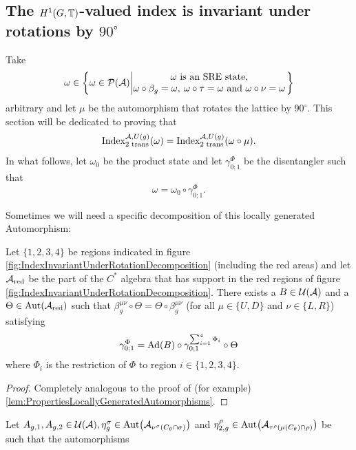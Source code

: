 \documentclass[12pt,a4paper,twoside]{article}
\numberwithin{equation}{section}
\begin{document}
\subsection{The $H^1(G,\TT)$-valued index is invariant under rotations by $90^\circ$}\label{sec:H1ValuedIndexInvariantUnderRotations}
Take
\begin{equation}
	\omega\in\left\{\omega\in\PP(\AA)\left| \begin{matrix}\omega\text{ is an SRE state,}\\\omega\circ\beta_g=\omega,\:\omega\circ\tau=\omega\text{ and }\omega\circ\nu=\omega\end{matrix} \right.\right\}
\end{equation}
arbitrary and let $\mu$ be the automorphism that rotates the lattice by $90^\circ$. This section will be dedicated to proving that
\begin{equation}
	\textrm{Index}_{\text{2 trans}}^{\AA,U(g)}(\omega)=\textrm{Index}_{\text{2 trans}}^{\AA,U(g)}(\omega\circ\mu).
\end{equation}
In what follows, let $\omega_0$ be the product state and let $\gamma^\Phi_{0;1}$ be the disentangler such that
\begin{equation}
	\omega=\omega_0\circ\gamma^\Phi_{0;1}.
\end{equation}

Sometimes we will need a specific decomposition of this locally generated Automorphism:
\begin{lemma}\label{lem:DecompositionOfLGAInCross}
	Let $\{1,2,3,4\}$ be regions indicated in figure \ref{fig:IndexInvariantUnderRotationDecomposition} (including the red areas) and let $\AA_{\text{red}}$ be the part of the $C^*$ algebra that has support in the red regions of figure \ref{fig:IndexInvariantUnderRotationDecomposition}. There exists a $B\in\UU(\AA)$ and a $\Theta\in\Aut{\AA_{\text{red}}}$ such that $\beta^{\mu\nu}_g\circ\Theta=\Theta\circ\beta^{\mu\nu}_g$ (for all $\mu\in\{U,D\}$ and $\nu\in\{L,R\}$) satisfying
	\begin{equation}
		\gamma^\Phi_{0;1}=\Ad{B}\circ\gamma^{\sum_{i=1}^4\Phi_i}_{0;1}\circ\Theta
	\end{equation}
	where $\Phi_i$ is the restriction of $\Phi$ to region $i\in\{1,2,3,4\}$.
\end{lemma}
\begin{proof}
	Completely analogous to the proof of (for example) \ref{lem:PropertiesLocallyGeneratedAutomorphisms}.
\end{proof}
Let $A_{g,1},A_{g,2}\in\UU(\AA),\eta^\sigma_g\in\Aut{\AA_{\nu^{\sigma}(C_\theta\cap\sigma)}}$ and $\eta^\rho_{2,g}\in\Aut{\AA_{\tau^{\rho}(\mu(C_\theta)\cap\rho)}}$ be such that the automorphisms
\end{document}
